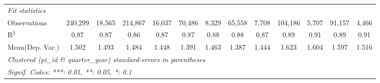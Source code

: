 \begin{tabular}{lcccccccccccc}
   \midrule
   \emph{Fit statistics}\\
   Observations                                               & 240,299       & 18,565        & 214,867        & 16,037         & 70,486        & 8,329          & 65,558        & 7,708          & 104,186       & 5,707        & 91,157        & 4,466\\  
   R$^2$                                                      & 0.87          & 0.87          & 0.86           & 0.87           & 0.87          & 0.88           & 0.88          & 0.87           & 0.89          & 0.91         & 0.89          & 0.91\\  
Mean(Dep. Var.) & 1.502 & 1.493 & 1.484 & 1.448 & 1.391 & 1.463 & 1.387 & 1.444 & 1.623 & 1.604 & 1.597 & 1.516 \\
   \midrule \midrule
   \multicolumn{13}{l}{\emph{Clustered (pi\_id \& quarter\_year) standard-errors in parentheses}}\\
   \multicolumn{13}{l}{\emph{Signif. Codes: ***: 0.01, **: 0.05, *: 0.1}}\\
\end{tabular}
\par\endgroup
